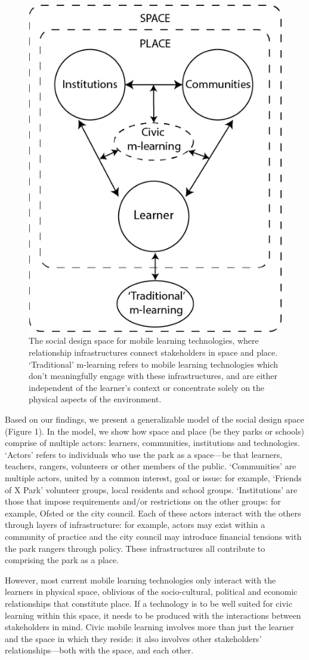 \begin{figure}
  \centering
  \includegraphics[width=0.45\columnwidth]{images/chapter04/designSpace.png}
  \caption[The social design space for mobile learning technologies]{The social design space for mobile learning technologies, where relationship infrastructures connect stakeholders in space and place. `Traditional' m-learning refers to mobile learning technologies which don’t meaningfully engage with these infrastructures, and are either independent of the learner’s context or concentrate solely on the physical aspects of the environment.}
  \label{fig:designSpace}
\end{figure}

Based on our findings, we present a generalizable model of the social design space (Figure 1). In the model, we show how space and place (be they parks or schools) comprise of multiple actors: learners, communities, institutions and technologies. `Actors' refers to individuals who use the park as a space—be that learners, teachers, rangers, volunteers or other members of the public. `Communities' are multiple actors, united by a common interest, goal or issue: for example, ‘Friends of X Park’ volunteer groups, local residents and school groups. `Institutions' are those that impose requirements and/or restrictions on the other groups: for example, Ofsted or the city council. Each of these actors interact with the others through layers of infrastructure: for example, actors may exist within a community of practice and the city council may introduce financial tensions with the park rangers through policy. These infrastructures all contribute to comprising the park as a place.

However, most current mobile learning technologies only interact with the learners in physical space, oblivious of the socio-cultural, political and economic relationships that constitute place. If a technology is to be well suited for civic learning within this space, it needs to be produced with the interactions between stakeholders in mind. Civic mobile learning involves more than just the learner and the space in which they reside: it also involves other stakeholders' relationships---both with the space, and each other.

